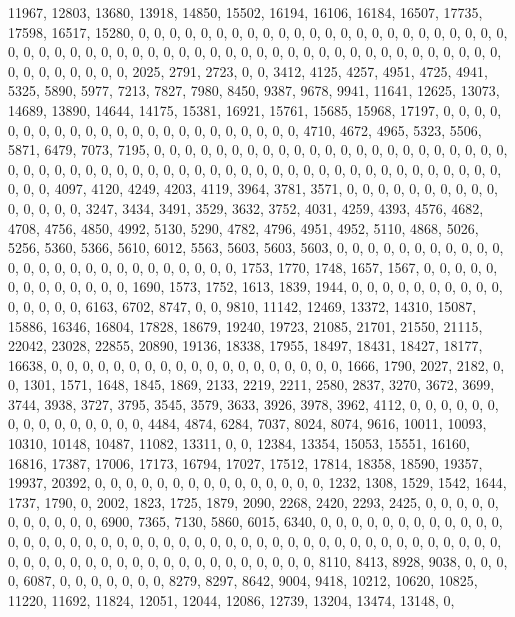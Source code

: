 \documentclass[
]{article}
\begin{document}
11967, 12803, 13680, 13918, 14850, 15502, 16194, 16106, 16184, 16507,
17735, 17598, 16517, 15280, 0, 0, 0, 0, 0, 0, 0, 0, 0, 0, 0, 0, 0, 0, 0,
0, 0, 0, 0, 0, 0, 0, 0, 0, 0, 0, 0, 0, 0, 0, 0, 0, 0, 0, 0, 0, 0, 0, 0,
0, 0, 0, 0, 0, 0, 0, 0, 0, 0, 0, 0, 0, 0, 0, 0, 0, 0, 0, 0, 0, 0, 0, 0,
0, 2025, 2791, 2723, 0, 0, 3412, 4125, 4257, 4951, 4725, 4941, 5325,
5890, 5977, 7213, 7827, 7980, 8450, 9387, 9678, 9941, 11641, 12625,
13073, 14689, 13890, 14644, 14175, 15381, 16921, 15761, 15685, 15968,
17197, 0, 0, 0, 0, 0, 0, 0, 0, 0, 0, 0, 0, 0, 0, 0, 0, 0, 0, 0, 0, 0, 0,
0, 4710, 4672, 4965, 5323, 5506, 5871, 6479, 7073, 7195, 0, 0, 0, 0, 0,
0, 0, 0, 0, 0, 0, 0, 0, 0, 0, 0, 0, 0, 0, 0, 0, 0, 0, 0, 0, 0, 0, 0, 0,
0, 0, 0, 0, 0, 0, 0, 0, 0, 0, 0, 0, 0, 0, 0, 0, 0, 0, 0, 0, 0, 0, 0, 0,
0, 0, 0, 0, 0, 4097, 4120, 4249, 4203, 4119, 3964, 3781, 3571, 0, 0, 0,
0, 0, 0, 0, 0, 0, 0, 0, 0, 0, 0, 0, 3247, 3434, 3491, 3529, 3632, 3752,
4031, 4259, 4393, 4576, 4682, 4708, 4756, 4850, 4992, 5130, 5290, 4782,
4796, 4951, 4952, 5110, 4868, 5026, 5256, 5360, 5366, 5610, 6012, 5563,
5603, 5603, 5603, 0, 0, 0, 0, 0, 0, 0, 0, 0, 0, 0, 0, 0, 0, 0, 0, 0, 0,
0, 0, 0, 0, 0, 0, 0, 0, 1753, 1770, 1748, 1657, 1567, 0, 0, 0, 0, 0, 0,
0, 0, 0, 0, 0, 0, 0, 1690, 1573, 1752, 1613, 1839, 1944, 0, 0, 0, 0, 0,
0, 0, 0, 0, 0, 0, 0, 0, 0, 0, 6163, 6702, 8747, 0, 0, 9810, 11142,
12469, 13372, 14310, 15087, 15886, 16346, 16804, 17828, 18679, 19240,
19723, 21085, 21701, 21550, 21115, 22042, 23028, 22855, 20890, 19136,
18338, 17955, 18497, 18431, 18427, 18177, 16638, 0, 0, 0, 0, 0, 0, 0, 0,
0, 0, 0, 0, 0, 0, 0, 0, 0, 0, 0, 1666, 1790, 2027, 2182, 0, 0, 1301,
1571, 1648, 1845, 1869, 2133, 2219, 2211, 2580, 2837, 3270, 3672, 3699,
3744, 3938, 3727, 3795, 3545, 3579, 3633, 3926, 3978, 3962, 4112, 0, 0,
0, 0, 0, 0, 0, 0, 0, 0, 0, 0, 0, 0, 0, 4484, 4874, 6284, 7037, 8024,
8074, 9616, 10011, 10093, 10310, 10148, 10487, 11082, 13311, 0, 0,
12384, 13354, 15053, 15551, 16160, 16816, 17387, 17006, 17173, 16794,
17027, 17512, 17814, 18358, 18590, 19357, 19937, 20392, 0, 0, 0, 0, 0,
0, 0, 0, 0, 0, 0, 0, 0, 0, 0, 1232, 1308, 1529, 1542, 1644, 1737, 1790,
0, 2002, 1823, 1725, 1879, 2090, 2268, 2420, 2293, 2425, 0, 0, 0, 0, 0,
0, 0, 0, 0, 0, 0, 6900, 7365, 7130, 5860, 6015, 6340, 0, 0, 0, 0, 0, 0,
0, 0, 0, 0, 0, 0, 0, 0, 0, 0, 0, 0, 0, 0, 0, 0, 0, 0, 0, 0, 0, 0, 0, 0,
0, 0, 0, 0, 0, 0, 0, 0, 0, 0, 0, 0, 0, 0, 0, 0, 0, 0, 0, 0, 0, 0, 0, 0,
0, 0, 0, 0, 0, 0, 0, 0, 0, 0, 8110, 8413, 8928, 9038, 0, 0, 0, 0, 6087,
0, 0, 0, 0, 0, 0, 0, 8279, 8297, 8642, 9004, 9418, 10212, 10620, 10825,
11220, 11692, 11824, 12051, 12044, 12086, 12739, 13204, 13474, 13148, 0,
\end{document}
